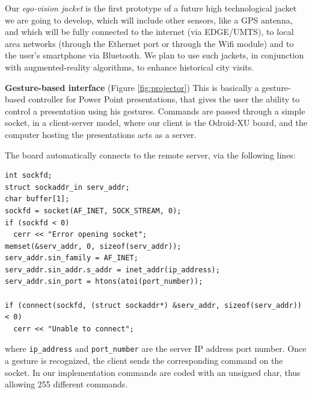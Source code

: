 Our \textit{ego-vision jacket} is the first prototype of a future high technological jacket we are going to develop, which will include other sensors, like a GPS antenna, and which will be fully connected to the internet (via EDGE/UMTS), to local area networks (through the Ethernet port or through the Wifi module) and to the user's smartphone via Bluetooth. We plan to use such jackets, in conjunction with augmented-reality algorithms, to enhance historical city visits.

\textbf{Gesture-based interface} (Figure \ref{fig:projector})
This is basically a gesture-based controller for Power Point presentations, that gives the user the ability to control a presentation using his gestures. Commands are passed through a simple socket, in a client-server model, where our client is the Odroid-XU board, and the computer hosting the presentations acts as a server.

The board automatically connects to the remote server, via the following lines:
\begin{lstlisting}[frame=single]
int sockfd;
struct sockaddr_in serv_addr;
char buffer[1];
sockfd = socket(AF_INET, SOCK_STREAM, 0);
if (sockfd < 0)
  cerr << "Error opening socket";
memset(&serv_addr, 0, sizeof(serv_addr));
serv_addr.sin_family = AF_INET;
serv_addr.sin_addr.s_addr = inet_addr(ip_address);
serv_addr.sin_port = htons(atoi(port_number));

if (connect(sockfd, (struct sockaddr*) &serv_addr, sizeof(serv_addr)) < 0)
  cerr << "Unable to connect";
\end{lstlisting}
where \verb+ip_address+ and \verb+port_number+ are the server IP address port number. Once a gesture is recognized, the client sends the corresponding command on the socket. In our implementation commands are coded with an unsigned char, thus allowing 255 different commands.

